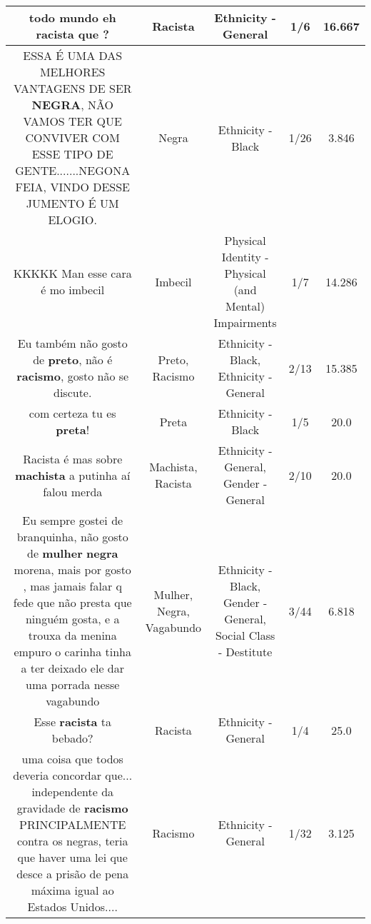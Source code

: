 \documentclass[11pt]{article}
\newlength\mylength
\begin{document}
\begin{center}
\begin{longtable}{|C{.65\mylength}|C{.30\mylength}|C{.12\mylength}|C{.12\mylength}|C{.12\mylength}|}
  \small todo mundo eh \textbf{racista} que ?\normalsize   & Racista & Ethnicity - General & 1/6 & 16.667 \\  \hline
  \small ESSA É UMA DAS MELHORES VANTAGENS DE SER \textbf{NEGRA}, NÃO VAMOS TER QUE CONVIVER COM ESSE TIPO DE GENTE.......NEGONA FEIA, VINDO DESSE JUMENTO É UM ELOGIO.\normalsize   & Negra & Ethnicity - Black & 1/26 & 3.846 \\  \hline
  \small KKKKK Man esse cara é mo imbecil\normalsize   & Imbecil & Physical Identity - Physical (and Mental) Impairments & 1/7 & 14.286 \\  \hline
  \small Eu também não gosto de \textbf{preto}, não é \textbf{racismo}, gosto não se discute.\normalsize   & Preto, Racismo & Ethnicity - Black, Ethnicity - General & 2/13 & 15.385 \\  \hline
  \small com certeza tu es \textbf{preta}!\normalsize   & Preta & Ethnicity - Black & 1/5 & 20.0 \\  \hline
  \small Racista é mas sobre \textbf{machista} a putinha aí falou merda\normalsize   & Machista, Racista & Ethnicity - General, Gender - General & 2/10 & 20.0 \\  \hline
  \small Eu sempre gostei de branquinha, não gosto de \textbf{mulher} \textbf{negra} morena, mais por gosto , mas jamais falar q fede que não presta que ninguém gosta, e a trouxa da menina empuro o carinha tinha a ter deixado ele dar uma porrada nesse vagabundo\normalsize   & Mulher, Negra, Vagabundo & Ethnicity - Black, Gender - General, Social Class - Destitute & 3/44 & 6.818 \\  \hline
  \small Esse \textbf{racista} ta bebado?\normalsize   & Racista & Ethnicity - General & 1/4 & 25.0 \\  \hline
  \small uma coisa que todos deveria concordar que...  independente da gravidade de \textbf{racismo} PRINCIPALMENTE contra os negras,  teria que haver uma lei que desce a prisão de pena máxima igual ao Estados Unidos....\normalsize   & Racismo & Ethnicity - General & 1/32 & 3.125 \\  \hline

\end{longtable}
\end{center}
\end{document}
